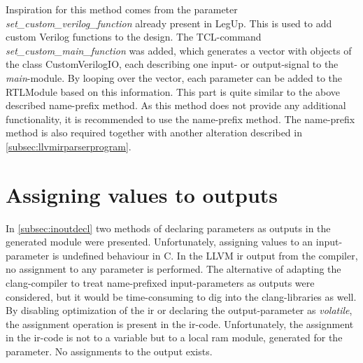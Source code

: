 Inspiration for this method comes from the parameter \textit{set\_custom\_verilog\_function} already present in LegUp. This is used to add custom Verilog functions to the design. The TCL-command \textit{set\_custom\_main\_function} was added, which generates a vector with objects of the class CustomVerilogIO, each describing one input- or output-signal to the \textit{main}-module. By looping over the vector, each parameter can be added to the RTLModule based on this information. This part is quite similar to the above described name-prefix method. As this method does not provide any additional functionality, it is recommended to use the name-prefix method. The name-prefix method is also required together with another alteration described in \cref{subsec:llvmirparserprogram}.

\section{\label{sec:assValueToOutput}Assigning values to outputs}
In \cref{subsec:inoutdecl} two methods of declaring parameters as outputs in the generated module were presented. Unfortunately, assigning values to an input-parameter is undefined behaviour in C. In the LLVM \gls{ir} output from the compiler, no assignment to any parameter is performed. The alternative of adapting the clang-compiler to treat name-prefixed input-parameters as outputs were considered, but it would be time-consuming to dig into the clang-libraries as well. By disabling optimization of the \gls{ir} or declaring the output-parameter as \textit{volatile}, the assignment operation is present in the \gls{ir}-code. Unfortunately, the assignment in the \gls{ir}-code is not to a variable but to a local \gls{ram} module, generated for the parameter. No assignments to the output exists.


